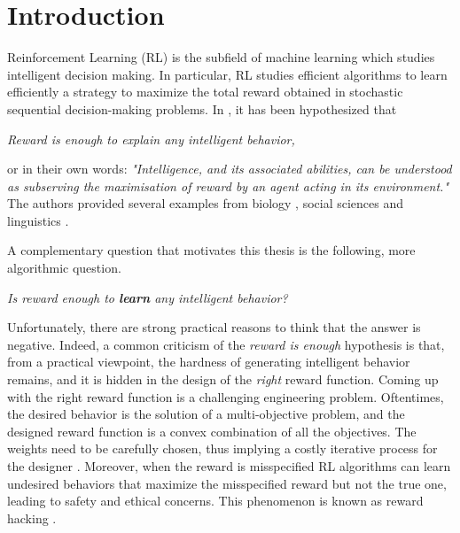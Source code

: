 \documentclass{article}
\begin{document}
\section{Introduction}
Reinforcement Learning (RL) \citep{Sutton:1998,bertsekas2001dynamic} is the subfield of machine learning which studies intelligent decision making. In particular, RL studies efficient algorithms to learn efficiently a strategy to maximize the total reward obtained in stochastic sequential decision-making problems. 
In \citep{silver2021reward}, it has been hypothesized that
\begin{center}
\emph{Reward is enough to explain any intelligent behavior,}
\end{center}
or in their own words: \emph{"Intelligence, and its associated abilities, can be understood as subserving the maximisation of reward by an agent acting in its environment."}
The authors provided several examples from biology \citep{schaffner2021neural,grujic2022rational}, social sciences \citep{bandura1977social} and linguistics \citep{bratman2010new}. 

A complementary question that motivates this thesis is the following, more algorithmic question. 
\begin{center}
\emph{Is reward enough to \textbf{learn} any intelligent behavior?}
\end{center}
Unfortunately, there are strong practical reasons to think that the answer is negative. Indeed, a common criticism of the \emph{reward is enough} hypothesis is that, from a practical viewpoint, the hardness of generating intelligent behavior remains, and it is hidden in the design of the \emph{right} reward function. 
Coming up with the right reward function is a challenging engineering problem. Oftentimes, the desired behavior is the solution of a multi-objective problem, and the designed reward function is a convex combination of all the objectives. The weights need to be carefully chosen, thus implying a costly iterative process for the designer \citep{Russell:1998,Ng:2000}. Moreover, when the reward is misspecified RL algorithms can learn undesired behaviors that maximize the misspecified reward but not the true one, leading to safety and ethical concerns. This phenomenon is known as reward hacking \citep{Amodei:2016}. 
\end{document}
